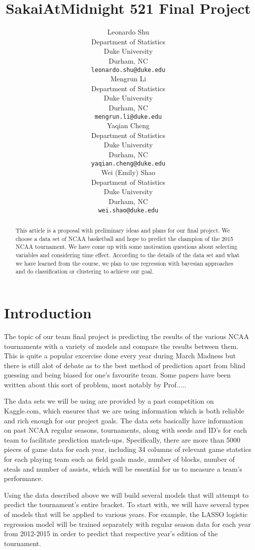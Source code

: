 \documentclass{article} %
\title{SakaiAtMidnight 521 Final Project}
\author{
  Leonardo Shu\\
  Department of Statistics\\
  Duke University\\
  Durham, NC \\
  \texttt{leonardo.shu@duke.edu} \\
  \And
  Mengrun Li \\
  Department of Statistics\\
  Duke University\\
  Durham, NC \\
  \texttt{mengrun.li@duke.edu} \\
  \AND
  Yaqian Cheng \\
  Department of Statistics\\
  Duke University\\
  Durham, NC \\
  \texttt{yaqian.cheng@duke.edu} \\
  \And
  Wei (Emily) Shao \\
  Department of Statistics\\
  Duke University\\
  Durham, NC \\
  \texttt{wei.shao@duke.edu} \\
}
\begin{document}
\maketitle

\begin{abstract}
This article is a proposal with preliminary ideas and plans for our final project. We choose a data set of NCAA basketball and hope to predict the champion of the 2015 NCAA tournament. We have come up with some motivation questions about selecting variables and considering time effect. According to the details of the data set and what we have learned from the course, we plan to use regression with bayesian approaches and do classification or clustering to achieve our goal.
\end{abstract}

\section{Introduction}

The topic of our team final project is predicting the results of the various NCAA tournaments with a variety of models and compare the results between them. This is quite a popular excercise done every year during March Madness but there is still alot of debate as to the best method of prediction apart from blind guessing and being biased for one's favourite team. Some papers have been written about this sort of problem, most notably by Prof.....

The data sets we will be using are provided by a past competition on Kaggle.com, which ensures that we are using information which is both reliable and rich enough for our project goals. The data sets basically have information on past NCAA regular seasons, tournaments, along with seeds and ID's for each team to facilitate prediction match-ups. Specifically, there are more than 5000 pieces of game data for each year, including 34 columns of relevant game statstics for each playing team such as field goals made, number of blocks, number of steals and number of assists, which will be essential for us to measure a team's performance.

Using the data described above we will build several models that will attempt to predict the tournament's entire bracket. To start with, we will have several types of models that will be applied to various years. For example, the LASSO logistic regression model will be trained separately with regular season data for each year from 2012-2015 in order to predict that respective year's edition of the tournament.
\end{document}
